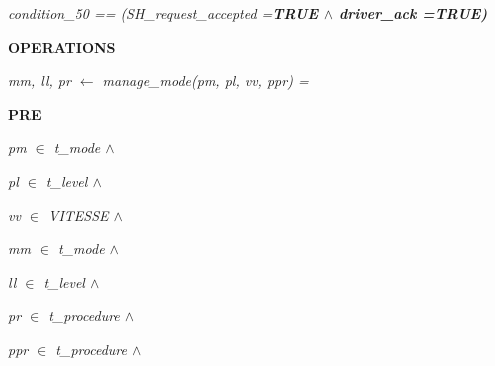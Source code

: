 \documentclass[11pt]{article}
\begin{document}
\begin{sloppypar}
\hspace*{0.20in}\hspace*{0.20in}\hspace*{0.20in}\hspace*{0.20in}\hspace*{0.20in}

\hspace*{0.20in}\it condition\_50 \rm == \rm (\it SH\_request\_accepted \rm =\hspace*{0.10in}\bf TRUE  $\land$  \it driver\_ack \rm =\hspace*{0.10in}\bf TRUE\rm )

\hspace*{0.20in}

\vspace*{4mm}
\bf OPERATIONS

\hspace*{0.20in}

\hspace*{0.20in}\hspace*{0.20in}\hspace*{0.20in}\hspace*{0.20in}\hspace*{0.20in}\hspace*{0.20in}\it mm\rm , \it ll\rm , \it pr  $\leftarrow$  \it manage\_mode\rm (\it pm\rm , \it pl\rm , \it vv\rm , \it ppr\rm ) \rm =

\hspace*{0.20in}\bf PRE

\hspace*{0.40in}\it pm  $\in$ \hspace*{0.10in}\it t\_mode  $\land$ 

\hspace*{0.40in}\it pl  $\in$ \hspace*{0.10in}\it t\_level  $\land$ 

\hspace*{0.40in}\it vv  $\in$ \hspace*{0.10in}\it VITESSE  $\land$ 

\hspace*{0.40in}\it mm  $\in$  \it t\_mode  $\land$ 

\hspace*{0.40in}\it ll  $\in$  \it t\_level  $\land$ 

\hspace*{0.40in}\it pr  $\in$  \it t\_procedure  $\land$ 

\hspace*{0.40in}\it ppr  $\in$  \it t\_procedure  $\land$ 


\end{sloppypar}
\end{document}
